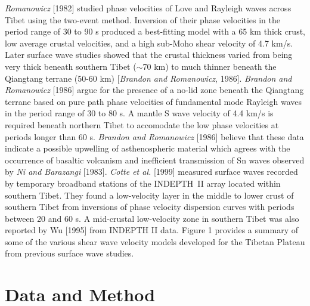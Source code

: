 \documentclass[12pt]{article}
\begin{document}
{\it Romanowicz} [1982] studied phase velocities of Love and Rayleigh waves across Tibet using the 
two-event method.    Inversion of their phase velocities in the period range of 30 to 
90 s produced a best-fitting model with a 65 km thick crust, low average crustal velocities, and a high sub-Moho 
shear velocity of 4.7 km/s.  Later surface wave studies showed that the crustal thickness varied from 
being very thick beneath southern Tibet ($\sim$70 km) to much thinner beneath the Qiangtang terrane (50-60 
km) [{\it Brandon and Romanowicz}, 1986].  {\it Brandon and Romanowicz} [1986] argue for the presence of a 
no-lid zone beneath the Qiangtang terrane based on pure path phase velocities of fundamental mode Rayleigh 
waves in the period range of 30 to 80 s.  A mantle S wave velocity of 4.4 km/s  is 
required beneath northern Tibet to accomodate the low phase velocities at periods longer than 60 s.  {\it Brandon and Romanowicz} 
[1986] believe that these data indicate a possible upwelling of asthenospheric material which agrees with 
the occurrence of basaltic volcanism and inefficient transmission of Sn
waves observed by {\it Ni and Barazangi} [1983].  {\it Cotte et al.} [1999] measured surface waves recorded by 
temporary broadband stations of the INDEPTH~II array located within southern Tibet.  They found a low-velocity layer in the middle 
to lower crust of southern Tibet from inversions of phase velocity dispersion curves with periods between 
20 and 60 s.  A mid-crustal low-velocity zone in southern Tibet was also reported by Wu [1995] from INDEPTH II 
data. Figure 1 provides a summary of some of the various shear wave velocity models developed for the 
Tibetan Plateau from previous surface wave studies. 

\section{Data and Method} 
\end{document}
